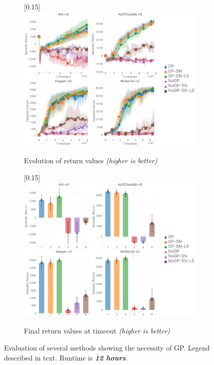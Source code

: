 \begin{figure}
  \center
  \begin{subfigure}[t]{0.49\textwidth}
    \center\scalebox{0.15}[0.15]{\includegraphics{Plots/fig03_gp_12h_4envs/plots_eval_env_ret_plot.pdf}}
    \caption{Evolution of return values \textit{(higher is better)}}
  \end{subfigure}
  \begin{subfigure}[t]{0.49\textwidth}
    \center\scalebox{0.15}[0.15]{\includegraphics{Plots/fig03_gp_12h_4envs/plots_eval_env_ret_barplot.pdf}}
    \caption{Final return values at timeout \textit{(higher is better)}}
  \end{subfigure}
  \caption{
  Evaluation of several methods showing the necessity of GP.
  Legend described in text.
  Runtime is \textbf{\emph{12 hours}}.}
  \label{resplotsgp}
\end{figure}

